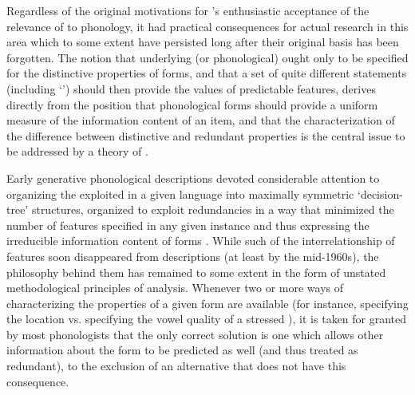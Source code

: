 Regardless of the original motivations for {\Jakobson}'s enthusiastic
acceptance of the relevance of  to phonology, it had
practical conse\-quences for actual research in this area which to some
extent have persisted long after their original basis has been
forgotten. The notion that underlying (or phonological)
 ought only to be specified for the distinctive
properties of forms, and that a set of quite different statements
(including `') should then provide the values of
predictable features, derives directly from the position that
phonological forms should provide a uniform measure of the information
content of an item, and that the characterization of the difference
between distinctive and redundant properties is the central issue to
be addressed by a theory of .

Early generative phonological descriptions devoted considerable
attention to organizing the  exploited in a given
language into maximally symmetric `decision-tree' structures,
organized to exploit redundancies in a way that minimized the number
of features specified in any given instance and thus expressing the
irreducible information content of forms
\citep{dresher.hall21:genphon}. While such  of the
interrelationship of features soon disappeared from descriptions (at
least by the mid-1960s), the philosophy behind them has remained to
some extent in the form of unstated methodological principles of
analysis. Whenever two or more ways of characterizing the properties
of a given form are available (for instance, specifying the location
vs. specifying the vowel quality of a stressed ), it is taken
for granted by most phonologists that the only correct solution is
one which allows other information about the form to be predicted as
well (and thus treated as redundant), to the exclusion of an
alternative that does not have this consequence.

